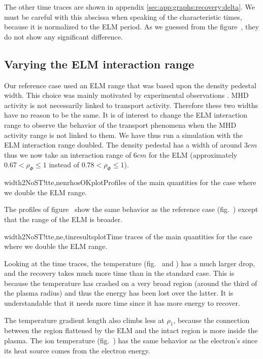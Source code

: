 The other time traces are shown in appendix \ref{sec:app:graphs:recovery:delta}. We must be careful with this abscissa when speaking of the characteristic times, because it is normalized to the ELM period. As we guessed from the figure~\AllFigsRefO{}, they do not show any significant difference.
\subsection{Varying the ELM interaction range}\label{sec:results:ELMs:rho}
Our reference case used an ELM range that was based upon the density pedestal width. This choice was mainly motivated by experimental observations \cite{bruckhart2010}. MHD activity is not necessarily linked to transport activity. Therefore these two widths have no reason to be the same. It is of interest to change the ELM interaction range to observe the behavior of the transport phenomena when the MHD activity range is not linked to them. We have thus run a simulation with the ELM interaction range doubled. The density pedestal has a width of around $3cm$ thus we now take an interaction range of $6cm$ for the ELM (approximately $0.67 < \rho_{\Phi} \le 1$ instead of $0.78 < \rho_{\Phi} \le 1$).

\begin{AllFigs}{width2NoST}{!t}{}{te,ne}{n}{rhosOKplot}{Profiles of the main quantities for the case where we double the ELM range.}
\end{AllFigs}
The profiles of figure~ show the same behavior as the reference case (fig.~) except that the range of the ELM is broader.

\begin{AllFigs}{width2NoST}{!t}{}{te,ne,ti}{n}{resultsplot}{Time traces of the main quantities for the case where we double the ELM range.}
\end{AllFigs}
Looking at the time traces, the temperature (fig.~ and ) has a much larger drop, and the recovery takes much more time than in the standard case. This is because the temperature has crashed on a very broad region (around the third of the plasma radius) and thus the energy has been lost over the latter. It is understandable that it needs more time since it has more energy to recover.

The temperature gradient length also climbs less at $\rho_1$, because the connection between the region flattened by the ELM and the intact region is more inside the plasma. The ion temperature (fig.~) has the same behavior as the electron's since its heat source comes from the electron energy.


